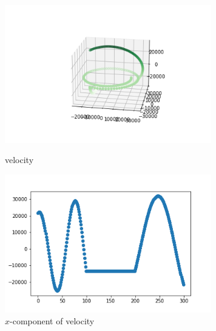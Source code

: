 \documentclass[12pt]{article}
\begin{document}
	\begin{figure}[H]
		\begin{multicols}{2}
			\includegraphics[width=\linewidth, height=6cm]{vs3.png} \caption{velocity} \label{vs3} \par
			\includegraphics[width=\linewidth, height=6cm]{vsx3.png} \caption{$x$-component of velocity} \label{vsx3} \par
		\end{multicols}
	\end{figure}
\end{document}
